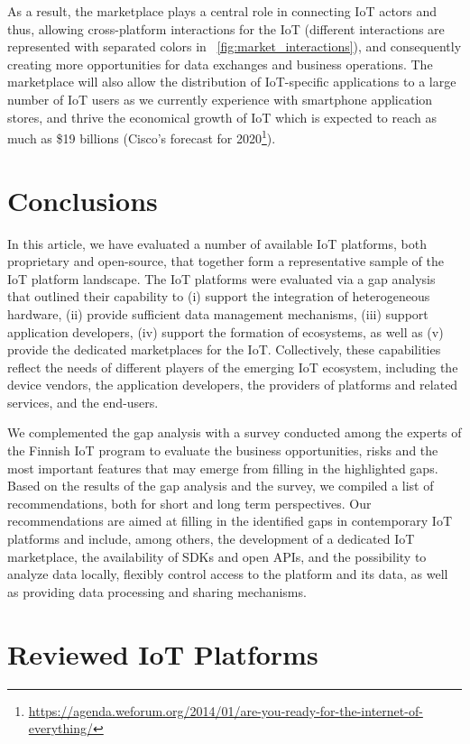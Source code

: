 \documentclass[preprint,10pt,5p]{elsarticle}
\begin{document}
As a result, the marketplace plays a central role in connecting IoT actors and thus, allowing
cross-platform interactions for the IoT (different interactions are represented with separated colors in \figurename{~\ref{fig:market_interactions}}), and consequently creating more opportunities for data exchanges and
business operations. The marketplace will also allow the distribution of IoT-specific applications to a large number 
of IoT users as we currently experience with smartphone application stores, and thrive the economical growth of IoT which is expected to reach as much as \$19 billions (Cisco's forecast for 2020\footnote{\url{https://agenda.weforum.org/2014/01/are-you-ready-for-the-internet-of-everything/}}).

\section{Conclusions}\label{sec:conclusion}

In this article, we have evaluated a number of available IoT platforms, both
proprietary and open-source, that together form a representative sample of the IoT
platform landscape.
The IoT platforms were evaluated via a gap analysis that
outlined their capability to (i) support the integration of heterogeneous
hardware, (ii) provide sufficient data management mechanisms, (iii) support
application developers, (iv) support the formation of ecosystems, as well as (v) 
provide the dedicated marketplaces for the IoT. 
Collectively, these capabilities reflect the
needs of different players of the emerging IoT ecosystem,
including the device vendors, the application developers, the providers of
platforms and related services, and the end-users.

We complemented the gap analysis with a survey conducted among the
experts of the Finnish IoT program to
evaluate the business opportunities, risks and the most important features
that may emerge from filling in the highlighted gaps. 
Based on the results of the gap analysis and the survey, we compiled a
list of recommendations, both for short and long term perspectives. 
Our recommendations are aimed at filling in the identified gaps in 
contemporary IoT platforms and include, among others, the development of a 
dedicated IoT marketplace, the availability of SDKs and open APIs,
and the possibility to analyze data locally, flexibly control
access to the platform and its data, as well as providing data processing and sharing mechanisms.

\appendix
\section{Reviewed IoT Platforms}
\label{appendix}
\end{document}
